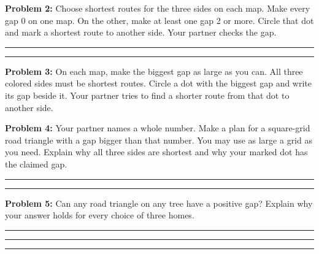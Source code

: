 \documentclass[12pt,letterpaper]{article}
\newcommand{\problem}[2]{\par\textbf{Problem #1:} #2\par}
\newcommand{\grid}[1]{\draw[gray!60,line width=.6pt,step=1] (0,0) grid (#1,#1);\foreach \x in {0,...,#1}\foreach \y in {0,...,#1}\fill (\x,\y) circle (1.7pt);}
\newcommand{\home}[3]{\node[draw,circle,fill=white,inner sep=2.5pt,font=\bfseries] at (#1,#2){#3};}
\newcommand{\corners}[1]{\home{0}{0}{A}\home{#1}{0}{B}\home{#1}{#1}{C}}
\begin{document}
\problem{2}{Choose shortest routes for the three sides on each map. Make every gap 0 on one map. On the other, make at least one gap 2 or more. Circle that dot and mark a shortest route to another side. Your partner checks the gap.}
\vspace{.3in}
\begin{center}
\hfill
{}
\end{center}
\vspace{.4in}\rule{\linewidth}{.4pt}\par\vspace{.4in}\rule{\linewidth}{.4pt}
\newpage
\problem{3}{On each map, make the biggest gap as large as you can. All three colored sides must be shortest routes. Circle a dot with the biggest gap and write its gap beside it. Your partner tries to find a shorter route from that dot to another side.}
\vspace{.2in}
\begin{center}
\hspace{1.0in}
\vspace{.45in}

\end{center}
\newpage
\problem{4}{Your partner names a whole number. Make a plan for a square-grid road triangle with a gap bigger than that number. You may use as large a grid as you need. Explain why all three sides are shortest and why your marked dot has the claimed gap.}
\vspace{2.6in}
\rule{\linewidth}{.4pt}\par\vspace{.4in}\rule{\linewidth}{.4pt}
\vspace{.25in}
\problem{5}{Can any road triangle on any tree have a positive gap? Explain why your answer holds for every choice of three homes.}
\vspace{1.0in}\rule{\linewidth}{.4pt}\par\vspace{.4in}\rule{\linewidth}{.4pt}\par\vspace{.4in}\rule{\linewidth}{.4pt}
\end{document}
